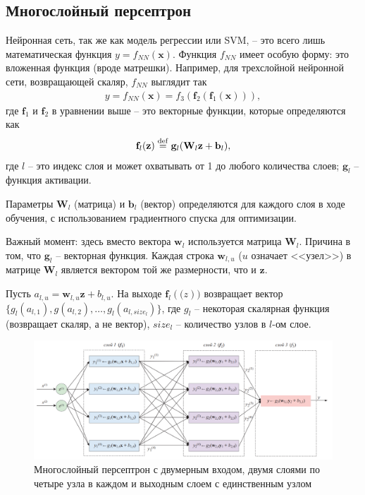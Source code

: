 \documentclass[%
	11pt,
	a4paper,
	utf8,
		]{article}
\begin{document}
\subsection{Многослойный персептрон}

Нейронная сеть, так же как модель регрессии или SVM, -- это всего лишь математическая функция $ y = f_{NN}(\mathbf{x}) $. Функция $ f_{NN} $ имеет особую форму: это вложенная функция (вроде матрешки). Например, для трехслойной нейронной сети, возвращающей скаляр, $ f_{NN} $ выглядит так \cite[]{burkov:2020}
\begin{align*}
	y = f_{NN}(\mathbf{x}) = f_3(\mathbf{f}_2(\mathbf{f}_1(\mathbf{x}))),
\end{align*}
где $ \mathbf{f}_1 $ и $ \mathbf{f}_2 $ в уравнении выше -- это векторные функции, которые определяются как
\begin{align*}
	\mathbf{f}_l (\mathbf{z}) \mathrel{\stackrel{\rm def }=} \mathbf{g}_l (\mathbf{W}_l \mathbf{z} + \mathbf{b}_l),
\end{align*}
где $ l $ -- это индекс слоя и может охватывать от 1 до любого количества слоев; $ \mathbf{g}_l $ -- функция активации.

Параметры $ \mathbf{W}_l $ (матрица) и $ \mathbf{b}_l $ (вектор) определяются для каждого слоя в ходе обучения, с использованием градиентного спуска для оптимизации.

Важный момент: здесь вместо вектора $ \mathbf{w}_l $ используется матрица $ \mathbf{W}_l $. Причина в том, что $ \mathbf{g}_l $ -- векторная функция. Каждая строка $ \mathbf{w}_{l, u} $ ($ u $ означает <<узел>>) в матрице $ \mathbf{W}_l $ является вектором той же размерности, что и $ \mathbf{z} $.

Пусть $ a_{l, u} = \mathbf{w}_{l, u} \mathbf{z} + b_{l, u} $. На выходе $ \mathbf{f}_l(\mathbf(z)) $ возвращает вектор $ \{ g_l(a_{l,1}), g(a_{l,2}), \ldots, g_l(a_{l, size_l}) \} $, где $ g_l $ -- некоторая скалярная функция (возвращает скаляр, а не вектор), $ size_l $ -- количество узлов в $ l $-ом слое.

\begin{figure}[h]
	\centering
	\includegraphics[scale=0.6]{figures/MLP.png}
	\caption{ Многослойный персептрон с двумерным входом, двумя слоями по четыре узла в каждом и выходным слоем с единственным узлом }\label{fig:MLP}
\end{figure}
\end{document}
